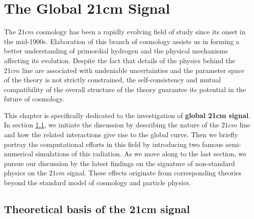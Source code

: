 \documentclass[12pt, TexShade, letterpaper]{report}
\begin{document}
\chapter{The Global 21cm Signal}
\label{chap:global21cm}
The $21cm$ cosmology has been a rapidly evolving field of study since its onset in the mid-1900s. Elaboration of this branch of cosmology assists us in forming a better understanding of primordial hydrogen and the physical mechanisms affecting its evolution. Despite the fact that details of the physics behind the $21cm$ line are associated with undeniable uncertainties and the parameter space of the theory is not strictly constrained, the self-consistency and mutual compatibility of the overall structure of the theory guarantee its potential in the future of cosmology. \par
This chapter is specifically dedicated to the investigation of  \textbf{global 21cm signal}. In section \ref{chap:global21cm,sub:physics}, we initiate the discussion by describing the nature of the $21cm$ line and how the related interactions give rise to the global curve. Then we briefly portray the computational efforts in this field by introducing two famous semi-numerical simulations of this radiation.
As we move along to the last section, we pursue our discussion by the latest findings on the signature of non-standard physics on the $21cm$ signal. These effects originate from corresponding theories beyond the standard model of cosmology and particle physics.\par
\section{Theoretical basis of the 21cm signal}
\label{chap:global21cm,sub:physics}
\end{document}
